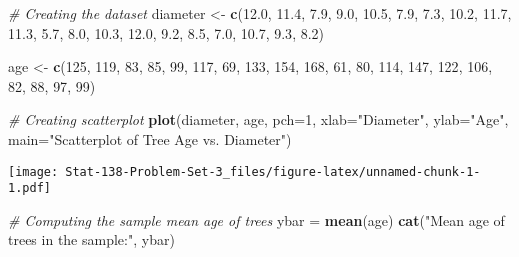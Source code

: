 \documentclass[
]{article}
\author{}
\date{\vspace{-2.5em}}
\newenvironment{Shaded}{\begin{snugshade}}{\end{snugshade}}
\newcommand{\AttributeTok}[1]{\textcolor[rgb]{0.13,0.29,0.53}{#1}}
\newcommand{\CommentTok}[1]{\textcolor[rgb]{0.56,0.35,0.01}{\textit{#1}}}
\newcommand{\DecValTok}[1]{\textcolor[rgb]{0.00,0.00,0.81}{#1}}
\newcommand{\FloatTok}[1]{\textcolor[rgb]{0.00,0.00,0.81}{#1}}
\newcommand{\FunctionTok}[1]{\textcolor[rgb]{0.13,0.29,0.53}{\textbf{#1}}}
\newcommand{\NormalTok}[1]{#1}
\newcommand{\OtherTok}[1]{\textcolor[rgb]{0.56,0.35,0.01}{#1}}
\newcommand{\StringTok}[1]{\textcolor[rgb]{0.31,0.60,0.02}{#1}}
\begin{document}
\begin{Shaded}
\begin{Highlighting}[]
\CommentTok{\# Creating the dataset}
\NormalTok{diameter }\OtherTok{\textless{}{-}} \FunctionTok{c}\NormalTok{(}\FloatTok{12.0}\NormalTok{, }\FloatTok{11.4}\NormalTok{, }\FloatTok{7.9}\NormalTok{, }\FloatTok{9.0}\NormalTok{, }\FloatTok{10.5}\NormalTok{, }\FloatTok{7.9}\NormalTok{, }\FloatTok{7.3}\NormalTok{, }\FloatTok{10.2}\NormalTok{, }\FloatTok{11.7}\NormalTok{, }\FloatTok{11.3}\NormalTok{,}
              \FloatTok{5.7}\NormalTok{, }\FloatTok{8.0}\NormalTok{, }\FloatTok{10.3}\NormalTok{, }\FloatTok{12.0}\NormalTok{, }\FloatTok{9.2}\NormalTok{, }\FloatTok{8.5}\NormalTok{, }\FloatTok{7.0}\NormalTok{, }\FloatTok{10.7}\NormalTok{, }\FloatTok{9.3}\NormalTok{, }\FloatTok{8.2}\NormalTok{)}

\NormalTok{age }\OtherTok{\textless{}{-}} \FunctionTok{c}\NormalTok{(}\DecValTok{125}\NormalTok{, }\DecValTok{119}\NormalTok{, }\DecValTok{83}\NormalTok{, }\DecValTok{85}\NormalTok{, }\DecValTok{99}\NormalTok{, }\DecValTok{117}\NormalTok{, }\DecValTok{69}\NormalTok{, }\DecValTok{133}\NormalTok{, }\DecValTok{154}\NormalTok{, }\DecValTok{168}\NormalTok{,}
         \DecValTok{61}\NormalTok{, }\DecValTok{80}\NormalTok{, }\DecValTok{114}\NormalTok{, }\DecValTok{147}\NormalTok{, }\DecValTok{122}\NormalTok{, }\DecValTok{106}\NormalTok{, }\DecValTok{82}\NormalTok{, }\DecValTok{88}\NormalTok{, }\DecValTok{97}\NormalTok{, }\DecValTok{99}\NormalTok{)}

\CommentTok{\# Creating scatterplot }
\FunctionTok{plot}\NormalTok{(diameter, age, }\AttributeTok{pch=}\DecValTok{1}\NormalTok{, }\AttributeTok{xlab=}\StringTok{"Diameter"}\NormalTok{, }\AttributeTok{ylab=}\StringTok{"Age"}\NormalTok{, }\AttributeTok{main=}\StringTok{"Scatterplot of Tree Age vs. Diameter"}\NormalTok{)}
\end{Highlighting}
\end{Shaded}

\texttt{[image: Stat-138-Problem-Set-3\_files/figure-latex/unnamed-chunk-1-1.pdf]}

\begin{Shaded}
\begin{Highlighting}[]
\CommentTok{\# Computing the sample mean age of trees}
\NormalTok{ybar }\OtherTok{=} \FunctionTok{mean}\NormalTok{(age)}
\FunctionTok{cat}\NormalTok{(}\StringTok{"Mean age of trees in the sample:"}\NormalTok{, ybar)}
\end{Highlighting}
\end{Shaded}
\end{document}
